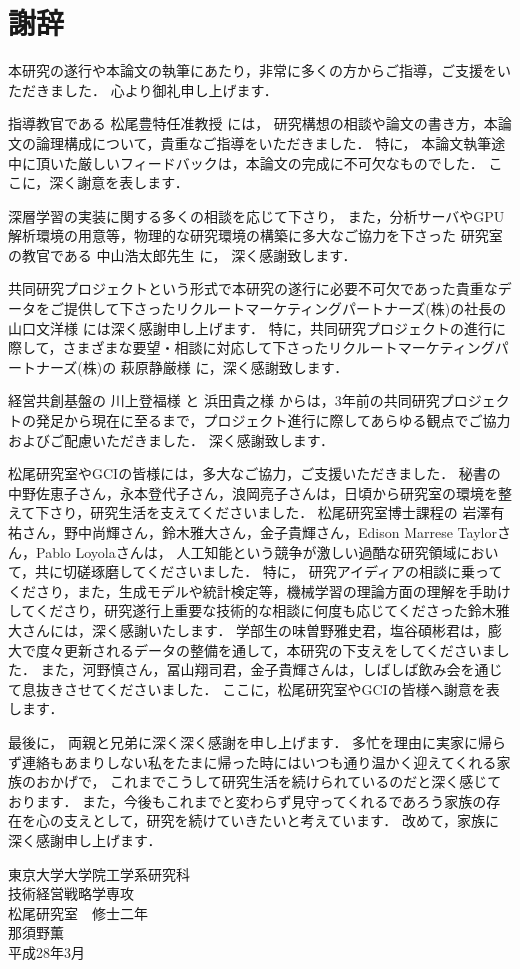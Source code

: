 \chapter*{謝辞}
\fancyhf{}
\rhead{}
\lhead{}
\cfoot{\thepage}

本研究の遂行や本論文の執筆にあたり，非常に多くの方からご指導，ご支援をいただきました．
心より御礼申し上げます．
\vvspace

指導教官である 松尾豊特任准教授 には，
研究構想の相談や論文の書き方，本論文の論理構成について，貴重なご指導をいただきました．
特に，
本論文執筆途中に頂いた厳しいフィードバックは，本論文の完成に不可欠なものでした．
ここに，深く謝意を表します．
\vvspace

深層学習の実装に関する多くの相談を応じて下さり，
また，分析サーバやGPU解析環境の用意等，物理的な研究環境の構築に多大なご協力を下さった
研究室の教官である 中山浩太郎先生 に，
深く感謝致します．
\vvspace

共同研究プロジェクトという形式で本研究の遂行に必要不可欠であった貴重なデータをご提供して下さったリクルートマーケティングパートナーズ(株)の社長の 山口文洋様 には深く感謝申し上げます．
特に，共同研究プロジェクトの進行に際して，さまざまな要望・相談に対応して下さったリクルートマーケティングパートナーズ(株)の 萩原静厳様 に，深く感謝致します．
\vvspace

経営共創基盤の 川上登福様 と 浜田貴之様 からは，3年前の共同研究プロジェクトの発足から現在に至るまで，プロジェクト進行に際してあらゆる観点でご協力およびご配慮いただきました．
深く感謝致します．
\vvspace

松尾研究室やGCIの皆様には，多大なご協力，ご支援いただきました．
秘書の 中野佐恵子さん，永本登代子さん，浪岡亮子さんは，日頃から研究室の環境を整えて下さり，研究生活を支えてくださいました．
松尾研究室博士課程の 岩澤有祐さん，野中尚輝さん，鈴木雅大さん，金子貴輝さん，Edison Marrese Taylorさん，Pablo Loyolaさんは，
人工知能という競争が激しい過酷な研究領域において，共に切磋琢磨してくださいました．
特に，
研究アイディアの相談に乗ってくださり，また，生成モデルや統計検定等，機械学習の理論方面の理解を手助けしてくださり，研究遂行上重要な技術的な相談に何度も応じてくださった鈴木雅大さんには，深く感謝いたします．
学部生の味曽野雅史君，塩谷碩彬君は，膨大で度々更新されるデータの整備を通して，本研究の下支えをしてくださいました．
また，河野慎さん，冨山翔司君，金子貴輝さんは，しばしば飲み会を通じて息抜きさせてくださいました．
ここに，松尾研究室やGCIの皆様へ謝意を表します．
\vvspace



最後に，
両親と兄弟に深く深く感謝を申し上げます．
多忙を理由に実家に帰らず連絡もあまりしない私をたまに帰った時にはいつも通り温かく迎えてくれる家族のおかげで，
これまでこうして研究生活を続けられているのだと深く感じております．
また，今後もこれまでと変わらず見守ってくれるであろう家族の存在を心の支えとして，研究を続けていきたいと考えています．
改めて，家族に深く感謝申し上げます．


\vvspace
\vvspace
\begin{flushright}
東京大学大学院工学系研究科\\
技術経営戦略学専攻\\
松尾研究室　修士二年\\
那須野薫\\
平成28年3月\\
\end{flushright}
